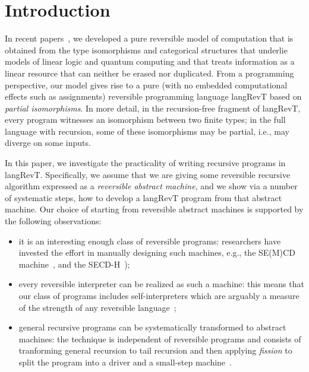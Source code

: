 \documentclass{llncs}
\begin{document}
\section{Introduction} 

In recent papers~\cite{rc2011,James:2012:IE:2103656.2103667}, we developed a
pure reversible model of computation that is obtained from the type
isomorphisms and categorical structures that underlie models of linear logic
and quantum computing and that treats information as a linear resource that
can neither be erased nor duplicated. From a programming perspective, our
model gives rise to a pure (with no embedded computational effects such as
assignments) reversible programming language {{langRevT}} based on
\emph{partial isomorphisms}. In more detail, in the recursion-free fragment
of {{langRevT}}, every program witnesses an isomorphism between two finite
types; in the full language with recursion, some of these isomorphisms may be
partial, i.e., may diverge on some inputs. 

In this paper, we investigate the practicality of writing recursive programs
in {{langRevT}}. Specifically, we assume that we are giving some reversible
recursive algorithm expressed as a \emph{reversible abstract machine}, and we
show via a number of systematic steps, how to develop a {{langRevT}} program
from that abstract machine. Our choice of starting from reversible abstract
machines is supported by the following observations:
\begin{itemize}
\item it is an interesting enough class of reversible programs: researchers
  have invested the effort in manually designing such machines, e.g., the
  SE(M)CD machine~\cite{Kluge:1999:SEMCD}, and the SECD-H~\cite{lorenz});
\item every reversible interpreter can be realized as such a machine: this
  means that our class of programs includes self-interpreters which are
  arguably a measure of the strength of any reversible
  language~\cite{Yokoyama:2008:PRP,Axelsen:2011:RPC:1987171.1987176,Yokoyama:2007:RPL:1244381.1244404};
\item general recursive programs can be systematically transformed to
  abstract machines: the technique is independent of reversible programs and
  consists of tranforming general recursion to tail recursion and then
  applying \emph{fission} to split the program into a driver and a small-step
  machine~\cite{Danvy:2008:RRN:1813347.1813350,Rendel:2010:ISD:1863523.1863525}.
\end{itemize}
\end{document}
